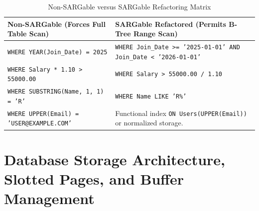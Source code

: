 \begin{table}[htbp]
\centering
\small
\caption{Non-SARGable versus SARGable Refactoring Matrix}
\label{tab:sargable_queries}
\begin{tabularx}{\textwidth}{X X}
\toprule
\textbf{Non-SARGable (Forces Full Table Scan)} & \textbf{SARGable Refactored (Permits B-Tree Range Scan)} \\
\midrule
\texttt{WHERE YEAR(Join\_Date) = 2025} & \texttt{WHERE Join\_Date >= '2025-01-01' AND Join\_Date < '2026-01-01'} \\
\texttt{WHERE Salary * 1.10 > 55000.00} & \texttt{WHERE Salary > 55000.00 / 1.10} \\
\texttt{WHERE SUBSTRING(Name, 1, 1) = 'R'} & \texttt{WHERE Name LIKE 'R\%'} \\
\texttt{WHERE UPPER(Email) = 'USER@EXAMPLE.COM'} & Functional index \texttt{ON Users(UPPER(Email))} or normalized storage. \\
\bottomrule
\end{tabularx}
\end{table}

\section{Database Storage Architecture, Slotted Pages, and Buffer Management}
\label{sec:dbms_storage_architecture}

